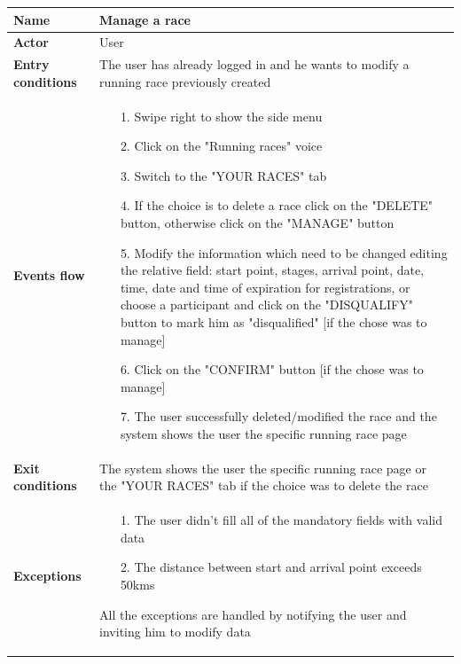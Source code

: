 \begin{table}[]
\begin{adjustbox}{width=\textwidth}
\footnotesize
\begin{tabular}{|p{}|p{}|}
\hline
\textbf{Name}             &  Manage a race\\ \hline
\textbf{Actor}            &  User\\ \hline
\textbf{Entry conditions} &  The user has already logged in and he wants to modify a running race previously created\\ \hline
\textbf{Events flow}      &
	\begin{itemize}
		\item[1.] Swipe right to show the side menu
		\item[2.] Click on the "Running races" voice
		\item[3.] Switch to the "YOUR RACES" tab
		\item[4.] If the choice is to delete a race click on the "DELETE" button, otherwise click on the "MANAGE" button
		\item[5.] Modify the information which need to be changed editing the relative field: start point, stages, arrival point, date, time, date and time of expiration for registrations, or choose a participant and click on the "DISQUALIFY" button to mark him as "disqualified" [if the chose was to manage]
		\item[6.] Click on the "CONFIRM" button [if the chose was to manage]
		\item[7.] The user successfully deleted/modified the race and the system shows the user the specific running race page
	\end{itemize}\\ \hline
\textbf{Exit conditions}  &  The system shows the user the specific running race page or the "YOUR RACES" tab if the choice was to delete the race\\ \hline
\textbf{Exceptions}       &
	\begin{itemize}
		\item[1.] The user didn’t fill all of the mandatory fields with valid data
		\item[2.] The distance between start and arrival point exceeds 50kms
	\end{itemize}
	All the exceptions are handled by notifying the user and inviting him to modify data\\ \hline
\end{tabular}
\end{adjustbox}
\end{table}

